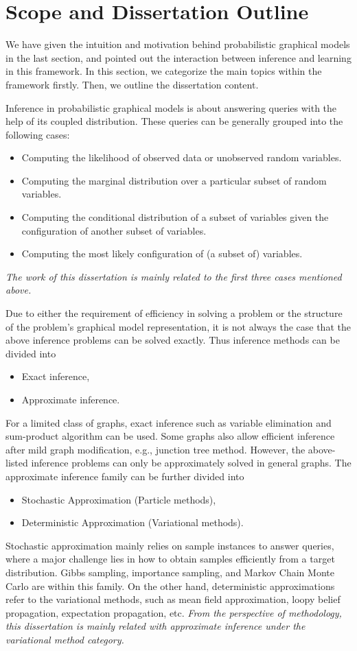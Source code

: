 \section{Scope and Dissertation Outline}\label{chpt1:sec:scope-outline}
We have given the intuition and motivation behind probabilistic graphical models in the last section, and pointed out the interaction between inference and learning in this framework. In this section, we categorize the main topics within the framework firstly. Then, we outline the dissertation content.

Inference in probabilistic graphical models is about answering queries with the help of its coupled distribution. These queries can be generally grouped into the following cases:
\begin{itemize}
\item Computing the likelihood of observed data or unobserved random variables.
\item Computing the marginal distribution over a particular subset of random variables.
\item Computing the conditional distribution of a subset of variables given the configuration of another subset of variables. 
\item Computing the most likely configuration of (a subset of) variables.
\end{itemize}
\textit{The work of this dissertation is mainly related to the first three cases mentioned above.}


Due to either the requirement of efficiency in solving a problem or the structure of the problem's graphical model representation, it is not always the case that the above inference problems can be solved exactly. Thus inference methods can be divided into
\begin{itemize}
\item Exact inference,
\item Approximate inference.
\end{itemize}
For a limited class of graphs, exact inference such as variable elimination and sum-product algorithm can be used. Some graphs also allow efficient inference after mild graph modification, e.g., junction tree method. However, the above-listed inference problems can only be approximately solved in general graphs. The approximate inference family can be further divided into
\begin{itemize}
\item Stochastic Approximation (Particle methods),
\item Deterministic Approximation (Variational methods).
\end{itemize}
Stochastic approximation mainly relies on sample instances to answer queries, where a major challenge lies in how to obtain samples efficiently from a target distribution. Gibbs sampling, importance sampling, and Markov Chain Monte Carlo are within this family. On the other hand, deterministic approximations refer to the variational methods, such as mean field approximation, loopy belief propagation, expectation propagation, etc. \textit{From the perspective of methodology, this dissertation is mainly related with approximate inference under the variational method category.}


